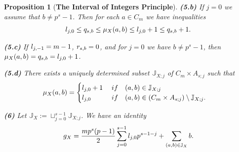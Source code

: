 \documentclass[10pt,a4paper]{amsart}
\newtheorem{proposition}{Proposition}
\def\l{\textup{l}}
\def\q{\textup{q}}
\def\r{\textup{r}}
\begin{document}
\begin{proposition}[{\bf The Interval of Integers Principle}]
\noindent
{\bf (5.b)} If $j=0$ we assume that $b\neq p^s-1$. Then for each $a\in C_m$ we have inequalities 
$$\l_{j,0}\le \q_{s,b}\le\mu_X(a,b)\le \l_{j,0}+1\le\q_{s,b}+1.$$

\noindent
{\bf (5.c)} If $\l_{j,-1}=m-1$, $\r_{s,b}=0$, and for $j=0$ we have $b\neq p^s-1$, then $\mu_X(a,b)=\q_{s,b}=\l_{j,0}+1$.

\noindent
{\bf (5.d)} There exists a uniquely determined subset $\mathbb J_{X;j}$ of $C_m\times A_{s;j}$ such that 
$$\mu_X(a,b)=\begin{cases}\l_{j,0}+1\quad\;\textup{if}\quad (a,b)\in\mathbb J_{X;j}\\
\l_{j,0}\quad\quad\quad\textup{if}\quad (a,b)\in(C_m\times A_{s;j})\setminus\mathbb J_{X;j}.\end{cases}$$

{\bf (6)} Let $\mathbb J_X:=\sqcup_{j=0}^{s-1}\mathbb J_{X;j}$. We have an identity
$$\textup{g}_X=\frac{mp^s(p-1)}{2}\sum_{j=0}^{s-1} \l_{j,0}p^{s-1-j}+\sum_{(a,b)\in\mathbb J_X} b.$$
\end{proposition}
\end{document}
